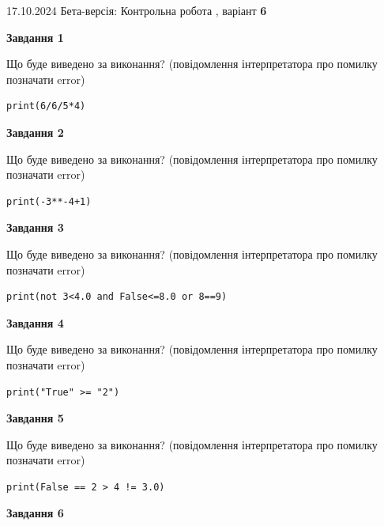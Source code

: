 \documentclass[12pt, ukrainian]{article}
\begin{document}
{\Large{17.10.2024 Бета-версія: Контрольна робота , варіант  \No \textbf { 6 }\par}}
{
\begin {large}
{\begin {center}\textbf{Завдання 1}\end {center}}

Що буде виведено за виконання? (повідомлення інтерпретатора про помилку позначати error)\par
\begin{verbatim}
print(6/6/5*4)
\end{verbatim}

{\begin {center}\textbf{Завдання 2}\end {center}}

Що буде виведено за виконання? (повідомлення інтерпретатора про помилку позначати error)\par
\begin{verbatim}
print(-3**-4+1)
\end{verbatim}

{\begin {center}\textbf{Завдання 3}\end {center}}

Що буде виведено за виконання? (повідомлення інтерпретатора про помилку позначати error)\par
\begin{verbatim}
print(not 3<4.0 and False<=8.0 or 8==9)
\end{verbatim}

{\begin {center}\textbf{Завдання 4}\end {center}}

Що буде виведено за виконання? (повідомлення інтерпретатора про помилку позначати error)\par
\begin{verbatim}
print("True" >= "2")
\end{verbatim}

{\begin {center}\textbf{Завдання 5}\end {center}}

Що буде виведено за виконання? (повідомлення інтерпретатора про помилку позначати error)\par
\begin{verbatim}
print(False == 2 > 4 != 3.0)
\end{verbatim}

{\begin {center}\textbf{Завдання 6}\end {center}}


\end{large}}
\end{document}

